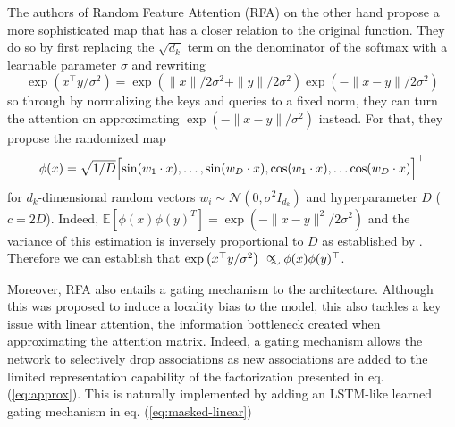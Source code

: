 \vspace{1em}

 The authors of Random Feature Attention (RFA) \cite{peng2021random} on the other hand propose a more sophisticated map that has a closer relation to the original function.  They do so by first replacing the $\sqrt{d_k}$ term on the denominator of the softmax with a learnable parameter $\sigma$ and rewriting 
 \begin{equation}
 \label{eq:exp-rewrite}
     \exp\left(x^\top y / \sigma^2 \right) = \exp\left(\|x\|/2\sigma^2 + \|y\|/2\sigma^2\right) \exp\left(-\|x - y\|/2\sigma^2\right)
 \end{equation}
 so through by normalizing the keys and queries to a fixed norm, they can turn the attention on approximating $\exp\left(-\|x - y\|/\sigma^2\right)$ instead. For that, they propose the randomized map
\begin{equation}
\label{eq:rfa}
\phi(x) = \sqrt{1/D} \Bigl[ \sin(w_1 \cdot x), \ldots, \sin(w_D \cdot x), \cos(w_1 \cdot x), \ldots \cos(w_D \cdot x) \Bigr]^\top
\end{equation}
for $d_k$-dimensional random vectors $w_i \sim \mathcal{N}(0, \sigma^2 I_{d_k}) $ and hyperparameter $D$ ($c = 2D$). Indeed, $\mathbb{E}[\phi(x) \phi(y)^T] = \exp(- \| x - y \|^2 / 2\sigma^2)$ and the variance of this estimation is inversely proportional to $D$ as established by \cite{yu2016orthogonal}. Therefore we can establish that $\exp\left(x^\top y / \sigma^2\right) \approxprop \phi(x)\phi(y)^\top$.

Moreover, RFA also entails a gating mechanism to the architecture. Although this was proposed to induce a locality bias to the model, this also tackles a key issue with linear attention, the information bottleneck created when approximating the attention matrix. Indeed, a gating mechanism allows the network to selectively drop associations as new associations are added to the limited representation capability of the factorization presented in eq. (\ref{eq:approx}). This is naturally implemented by adding an LSTM-like \cite{10.1162/neco.1997.9.8.1735} learned gating mechanism in eq. (\ref{eq:masked-linear})

\vspace{1em}

